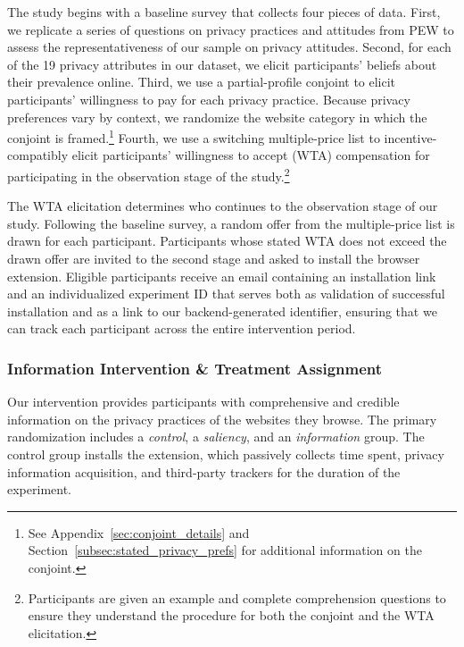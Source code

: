 \documentclass[12pt]{article}
\theoremstyle{definition}
\theoremstyle{remark}
\begin{document}
\begin{figure}[H]
\end{figure}

The study begins with a baseline survey that collects four pieces of data. First, we replicate a series of questions on privacy practices and attitudes from PEW \citep{PewPrivacy} to assess the representativeness of our sample on privacy attitudes. Second, for each of the 19 privacy attributes in our dataset, we elicit participants' beliefs about their prevalence online. Third, we use a partial-profile conjoint \citep{doi:10.1287/inte.31.3s.56.9676, ALLENBY2019151} to elicit participants' willingness to pay for each privacy practice. Because privacy preferences vary by context, we randomize the website category in which the conjoint is framed.\footnote{See Appendix~\ref{sec:conjoint_details} and Section~\ref{subsec:stated_privacy_prefs} for additional information on the conjoint.} Fourth, we use a switching multiple-price list \citep{andersen2006elicitation} to incentive-compatibly elicit participants' willingness to accept (WTA) compensation for participating in the observation stage of the study.\footnote{Participants are given an example and complete comprehension questions to ensure they understand the procedure for both the conjoint and the WTA elicitation.}
 
The WTA elicitation determines who continues to the observation stage of our study. Following the baseline survey, a random offer from the multiple-price list is drawn for each participant. Participants whose stated WTA does not exceed the drawn offer are invited to the second stage and asked to install the browser extension. Eligible participants receive an email containing an installation link and an individualized experiment ID that serves both as validation of successful installation and as a link to our backend-generated identifier, ensuring that we can track each participant across the entire intervention period.

\subsubsection{Information Intervention \& Treatment Assignment}

Our intervention provides participants with comprehensive and credible information on the privacy practices of the websites they browse. The primary randomization includes a \textit{control}, a \textit{saliency}, and an \textit{information} group. The control group installs the extension, which passively collects time spent, privacy information acquisition, and third-party trackers for the duration of the experiment.
\end{document}
